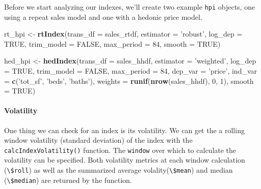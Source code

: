 \documentclass[]{article}
\newenvironment{Shaded}{\begin{snugshade}}{\end{snugshade}}
\newcommand{\DataTypeTok}[1]{\textcolor[rgb]{0.13,0.29,0.53}{#1}}
\newcommand{\DecValTok}[1]{\textcolor[rgb]{0.00,0.00,0.81}{#1}}
\newcommand{\KeywordTok}[1]{\textcolor[rgb]{0.13,0.29,0.53}{\textbf{#1}}}
\newcommand{\NormalTok}[1]{#1}
\newcommand{\OtherTok}[1]{\textcolor[rgb]{0.56,0.35,0.01}{#1}}
\newcommand{\StringTok}[1]{\textcolor[rgb]{0.31,0.60,0.02}{#1}}
\let\oldparagraph\paragraph
\renewcommand{\paragraph}[1]{\oldparagraph{#1}\mbox{}}
\begin{document}
Before we start analyzing our indexes, we'll create two example
\texttt{hpi} objects, one using a repeat sales model and one with a
hedonic price model.

\begin{Shaded}
\begin{Highlighting}[]
\NormalTok{  rt_hpi <-}\StringTok{ }\KeywordTok{rtIndex}\NormalTok{(}\DataTypeTok{trans_df =}\NormalTok{ sales_rtdf,}
                    \DataTypeTok{estimator =} \StringTok{'robust'}\NormalTok{,}
                    \DataTypeTok{log_dep =} \OtherTok{TRUE}\NormalTok{,}
                    \DataTypeTok{trim_model =} \OtherTok{FALSE}\NormalTok{,}
                    \DataTypeTok{max_period =} \DecValTok{84}\NormalTok{,}
                    \DataTypeTok{smooth =} \OtherTok{TRUE}\NormalTok{)}

\NormalTok{  hed_hpi <-}\StringTok{ }\KeywordTok{hedIndex}\NormalTok{(}\DataTypeTok{trans_df =}\NormalTok{ sales_hhdf,}
                      \DataTypeTok{estimator =} \StringTok{'weighted'}\NormalTok{,}
                      \DataTypeTok{log_dep =} \OtherTok{TRUE}\NormalTok{,}
                      \DataTypeTok{trim_model =} \OtherTok{FALSE}\NormalTok{,}
                      \DataTypeTok{max_period =} \DecValTok{84}\NormalTok{,}
                      \DataTypeTok{dep_var =} \StringTok{'price'}\NormalTok{,}
                      \DataTypeTok{ind_var =} \KeywordTok{c}\NormalTok{(}\StringTok{'tot_sf'}\NormalTok{, }\StringTok{'beds'}\NormalTok{, }\StringTok{'baths'}\NormalTok{),}
                      \DataTypeTok{weights =} \KeywordTok{runif}\NormalTok{(}\KeywordTok{nrow}\NormalTok{(sales_hhdf), }\DecValTok{0}\NormalTok{, }\DecValTok{1}\NormalTok{),}
                      \DataTypeTok{smooth =} \OtherTok{TRUE}\NormalTok{)}
\end{Highlighting}
\end{Shaded}

\hypertarget{volatility}{%
\paragraph{Volatility}\label{volatility}}

One thing we can check for an index is its volatility. We can get the a
rolling window volatility (standard deviation) of the index with the
\texttt{calcIndexVolatility()} function. The \texttt{window} over which
to calculate the volatility can be specified. Both volatility metrics at
each window calculation (\texttt{\textbackslash{}\$roll}) as well as the
summarized average volality(\texttt{\textbackslash{}\$mean}) and median
(\texttt{\textbackslash{}\$median}) are returned by the function.
\end{document}
